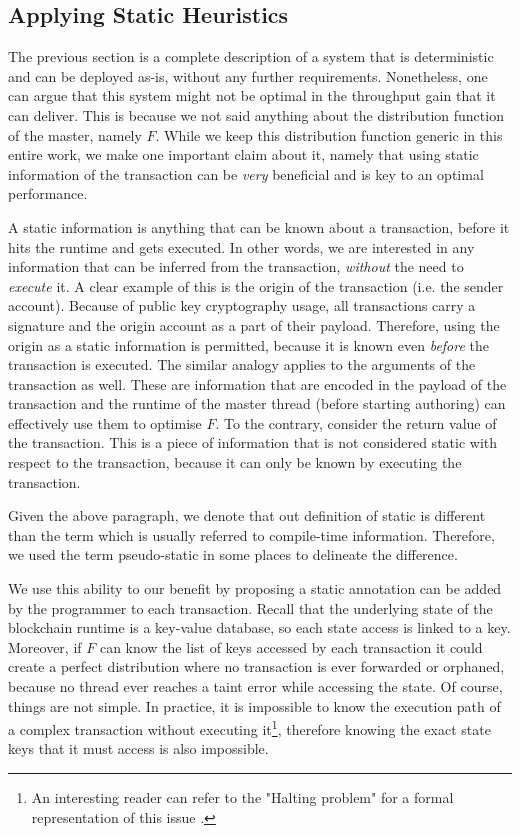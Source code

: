 \subsection{Applying Static Heuristics} \label{subsec:applying_static_hints}

The previous section is a complete description of a system that is deterministic and can be deployed
as-is, without any further requirements. Nonetheless, one can argue that this system might not be
optimal in the throughput gain that it can deliver. This is because we not said anything about the
distribution function of the master, namely $F$. While we keep this distribution function generic in
this entire work, we make one important claim about it, namely that using static information of
the transaction can be \textit{very} beneficial and is key to an optimal performance.

A static information is anything that can be known about a transaction, before it hits the runtime
and gets executed. In other words, we are interested in any information that can be inferred from
the transaction, \textit{without} the need to \textit{execute} it. A clear example of this is the
origin of the transaction (i.e. the sender account). Because of public key cryptography usage, all
transactions carry a signature and the origin account as a part of their payload. Therefore, using
the origin as a static information is permitted, because it is known even \textit{before} the
transaction is executed. The similar analogy applies to the arguments of the transaction as well.
These are information that are encoded in the payload of the transaction and the runtime of the
master thread (before starting authoring) can effectively use them to optimise $F$. To the contrary,
consider the return value of the transaction. This is a piece of information that is not considered
static with respect to the transaction, because it can only be known by executing the transaction.

\begin{remark}
	Given the above paragraph, we denote that out definition of static is different than the term
	which is usually referred to compile-time information. Therefore, we used the term pseudo-static
	in some places to delineate the difference.
\end{remark}

We use this ability to our benefit by proposing a static annotation can be added by the programmer
to each transaction. Recall that the underlying state of the blockchain runtime is a key-value
database, so each state access is linked to a key. Moreover, if $F$ can know the list of keys
accessed by each transaction it could create a perfect distribution where no transaction is ever
forwarded or orphaned, because no thread ever reaches a taint error while accessing the state. Of
course, things are not simple. In practice, it is impossible to know the execution path of a complex
transaction without executing it\footnote{An interesting reader can refer to the "Halting problem"
for a formal representation of this issue \cite{burkholderHaltingProblem1987}.}, therefore knowing
the exact state keys that it must access is also impossible.

